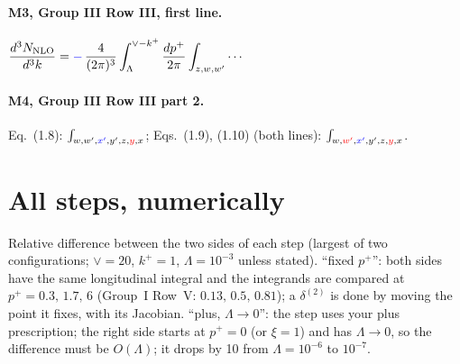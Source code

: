 \documentclass[10pt]{article}
\newcommand{\new}[1]{{\color{blue}#1}}
\newcommand{\old}[1]{{\color{red}#1}}
\begin{document}
\paragraph{M3, Group III Row III, first line.} $\displaystyle\frac{d^{3}N_{\rm NLO}}{d^{3}k} = \new{-}\,\frac{4}{(2\pi)^{3}} \int_{\Lambda}^{\vee -k^{+}} \frac{dp^{+}}{2\pi}\int_{z,w,w^{\prime}}\cdots$
\paragraph{M4, Group III Row III part 2.} Eq.~(1.8): $\int_{w,w',\new{x'},y',z,\old{y},x}$; Eqs.~(1.9), (1.10) (both lines): $\int_{w,\old{w'},\new{x'},y',z,\old{y},x}$.

\section{All steps, numerically}\label{sec:table}
Relative difference between the two sides of each step (largest of two configurations; $\vee=20$, $k^+=1$, $\Lambda=10^{-3}$ unless stated). ``fixed $p^+$'': both sides have the same longitudinal integral and the integrands are compared at $p^+=0.3,\,1.7,\,6$ (Group~I Row~V: $0.13,\,0.5,\,0.81$); a $\delta^{(2)}$ is done by moving the point it fixes, with its Jacobian. ``plus, $\Lambda\to0$'': the step uses your plus prescription; the right side starts at $p^+=0$ (or $\xi=1$) and has $\Lambda\to0$, so the difference must be $O(\Lambda)$; it drops by 10 from $\Lambda=10^{-6}$ to $10^{-7}$.
\end{document}
